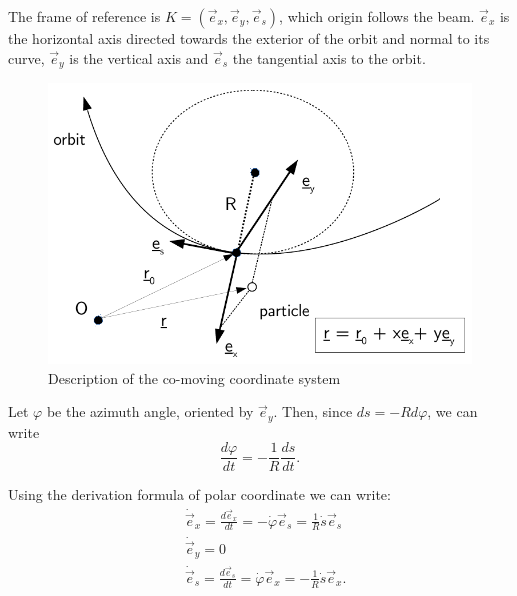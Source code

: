 The frame of reference is $K=(\vec{e}_x,\vec{e}_y, \vec{e}_s)$, which origin follows the beam. $\vec{e}_x$ is the horizontal axis directed towards the exterior of the orbit and normal to its curve, $\vec{e}_y$ is the vertical axis and $\vec{e}_s$ the tangential axis to the orbit.
\begin{figure}[!h]
    \centering
    \includegraphics[width=0.8\linewidth]{img/orbit_coordinates.pdf}
    \caption{\label{fig:coordinate system}Description of the co-moving coordinate system}
\end{figure}
Let $\varphi$ be the azimuth angle, oriented by $\vec{e}_y$. Then, since $ds = -R d\varphi$, we can write
\begin{equation}
\frac{d \varphi}{d t}  = -\frac{1}{R} \frac{d s}{d t}.
\end{equation}

Using the derivation formula of polar coordinate we can write:
\begin{align}
&\dot{\vec{e}}_x = \frac{d\vec{e}_x}{d t} = -\dot{\varphi} \vec{e}_s = \frac{1}{R} \dot{s}\vec{e}_s \nonumber \\
&\dot{\vec{e}}_y = 0 \\
&\dot{\vec{e}}_s = \frac{d\vec{e}_s}{d t} = \dot{\varphi} \vec{e}_x = -\frac{1}{R} \dot{s}\vec{e}_x \nonumber.
\end{align}

